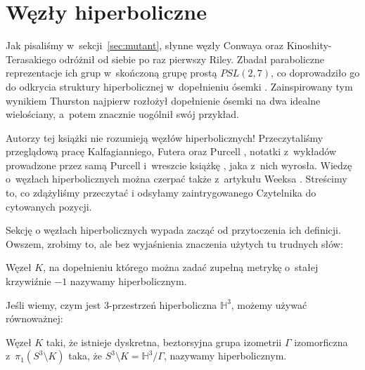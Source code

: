 

\section{Węzły hiperboliczne}
%
\label{sec:hyperbolic}%
Jak pisaliśmy w~sekcji~\ref{sec:mutant}, słynne węzły Conwaya oraz Kinoshity-Terasakiego odróżnił od siebie po raz pierwszy Riley.
%
%
%
Zbadał paraboliczne reprezentacje ich grup w~skończoną grupę prostą $PSL(2, 7)$, co doprowadziło go do odkrycia struktury hiperbolicznej w~dopełnieniu ósemki \cite{riley1975}.
%
Zainspirowany tym wynikiem Thurston najpierw rozłożył dopełnienie ósemki na dwa idealne wielościany, a~potem znacznie uogólnił swój przykład.
%

Autorzy tej książki nie rozumieją węzłów hiperbolicznych!
Przeczytaliśmy przeglądową pracę Kalfagianniego, Futera oraz Purcell \cite{purcell2019}, notatki z~wykładów prowadzone przez samą Purcell i~wreszcie książkę \cite{purcell2020}, jaka z~nich wyrosła.
%
%
%
Wiedzę o~węzłach hiperbolicznych można czerpać także z~artykułu Weeksa \cite{weeks2005}.
%
Streścimy to, co zdążyliśmy przeczytać i odsyłamy zaintrygowanego Czytelnika do cytowanych pozycji.

Sekcję o węzłach hiperbolicznych wypada zacząć od przytoczenia ich definicji.
Owszem, zrobimy to, ale bez wyjaśnienia znaczenia użytych tu trudnych słów:

\begin{definition}[hiperboliczny]
    Węzeł $K$, na dopełnieniu którego można zadać zupełną metrykę o~stałej krzywiźnie $-1$ nazywamy hiperbolicznym.
\end{definition}

Jeśli wiemy, czym jest 3-przestrzeń hiperboliczna $\mathbb H^3$, możemy używać równoważnej:

\begin{definition}
    Węzeł $K$ taki, że istnieje dyskretna, beztorsyjna grupa izometrii $\Gamma$ izomorficzna z~$\pi_1(S^3 \setminus K)$ taka, że $S^3 \setminus K = \mathbb H^3 / \Gamma$, nazywamy hiperbolicznym.
\end{definition}

